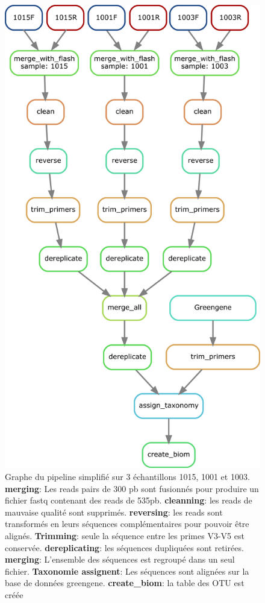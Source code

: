 \documentclass[12pt,a4paper]{article}
\begin{document}
\begin{figure}[!ht]
\begin{center}
\includegraphics[scale=0.5]{img/pipeline_trio.png}\hfill
\end{center}
\caption{Graphe du pipeline simplifié sur 3 échantillons 1015, 1001 et 1003.\\ \textbf{merging}: Les reads pairs de 300 pb sont fusionnés  pour produire un fichier fastq contenant des reads de 535pb. \textbf{cleanning}: les reads de mauvaise qualité sont supprimés. \textbf{reversing}: les reads sont transformés en leurs séquences complémentaires pour pouvoir être alignés. \textbf{Trimming}: seule la séquence entre les primes V3-V5 est conservée. \textbf{dereplicating}: les séquences dupliquées sont retirées. \textbf{merging}: L'ensemble des séquences est regroupé dans un seul fichier. \textbf{Taxonomie assignent}: Les séquences sont alignées sur la base de données greengene. \textbf{create\_biom}: la table des OTU est créée }
\label{pipeline_trio}
\end{figure}
\end{document}
